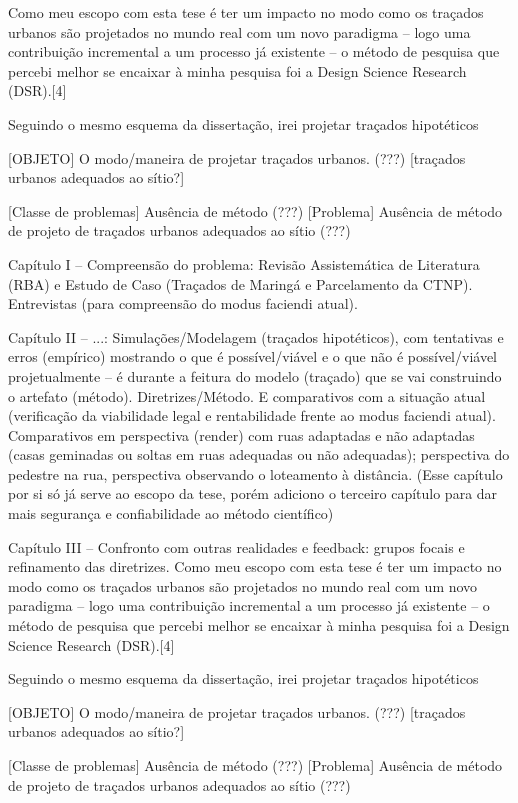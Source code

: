 \documentclass[]{report}
\begin{document}
	Como meu escopo com esta tese é ter um impacto no modo como os traçados urbanos são projetados no mundo real com um novo paradigma – logo uma contribuição incremental a um processo já existente – o método de pesquisa que percebi melhor se encaixar à minha pesquisa foi a Design Science Research (DSR).[4]

	Seguindo o mesmo esquema da dissertação, irei projetar traçados hipotéticos

	[OBJETO] O modo/maneira de projetar traçados urbanos. (???) [traçados urbanos adequados ao sítio?]

	[Classe de problemas] Ausência de método (???) [Problema] Ausência de método de projeto de traçados urbanos adequados ao sítio (???)

	Capítulo I – Compreensão do problema: Revisão Assistemática de Literatura (RBA) e Estudo de Caso (Traçados de Maringá e Parcelamento da CTNP). Entrevistas (para compreensão do modus faciendi atual).

	Capítulo II – ...: Simulações/Modelagem (traçados hipotéticos), com tentativas e erros (empírico) mostrando o que é possível/viável e o que não é possível/viável projetualmente – é durante a feitura do modelo (traçado) que se vai construindo o artefato (método). Diretrizes/Método. E comparativos com a situação atual (verificação da viabilidade legal e rentabilidade frente ao modus faciendi atual). Comparativos em perspectiva (render) com ruas adaptadas e não adaptadas (casas geminadas ou soltas em ruas adequadas ou não adequadas); perspectiva do pedestre na rua, perspectiva observando o loteamento à distância. (Esse capítulo por si só já serve ao escopo da tese, porém adiciono o terceiro capítulo para dar mais segurança e confiabilidade ao método científico)

	Capítulo III – Confronto com outras realidades e feedback: grupos focais e refinamento das diretrizes.
	Como meu escopo com esta tese é ter um impacto no modo como os traçados urbanos são projetados no mundo real com um novo paradigma – logo uma contribuição incremental a um processo já existente – o método de pesquisa que percebi melhor se encaixar à minha pesquisa foi a Design Science Research (DSR).[4]

	Seguindo o mesmo esquema da dissertação, irei projetar traçados hipotéticos

	[OBJETO] O modo/maneira de projetar traçados urbanos. (???) [traçados urbanos adequados ao sítio?]

	[Classe de problemas] Ausência de método (???) [Problema] Ausência de método de projeto de traçados urbanos adequados ao sítio (???)
\end{document}
